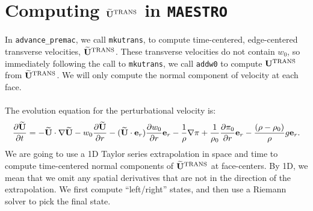 \newpage

\section{Computing $\widetilde{{\bf U}}^{\rm TRANS}$ in {\tt MAESTRO}}
In {\tt advance\_premac}, we call {\tt mkutrans}, to compute
time-centered, edge-centered transverse velocities, $\widetilde{{\bf U}}^{\rm TRANS}$.
These transverse velocities do not contain $w_0$, so immediately
following the call to {\tt mkutrans}, we call {\tt addw0} to compute
${\bf U}^{\rm TRANS}$ from $\widetilde{{\bf U}}^{\rm TRANS}$.  We will only compute the normal
component of velocity at each face.\\ \\
The evolution equation for the perturbational velocity is:
\begin{equation}
\frac{\partial\widetilde{{\bf U}}}{\partial t} = -\widetilde{{\bf U}}\cdot\nabla\widetilde{{\bf U}} - w_0\frac{\partial\widetilde{{\bf U}}}{\partial r} - (\widetilde{{\bf U}}\cdot{\bf e}_r)\frac{\partial w_0}{\partial r}{\bf e}_r - \frac{1}{\rho}\nabla\pi + \frac{1}{\rho_0}\frac{\partial\pi_0}{\partial r}{\bf e}_r - \frac{(\rho-\rho_0)}{\rho}g{\bf e}_r.\label{Perturbational Velocity Equation}
\end{equation}
We are going to use a 1D Taylor series extrapolation in space and time
to compute time-centered normal components of $\widetilde{{\bf U}}^{\rm TRANS}$ at
face-centers.  By 1D, we mean that we omit any spatial derivatives
that are not in the direction of the extrapolation.  We first compute
``left/right'' states, and then use a Riemann solver to pick the final
state.

